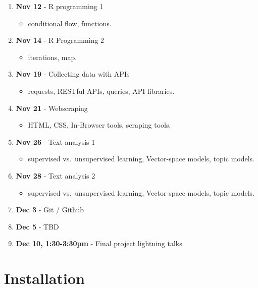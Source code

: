 \documentclass[]{book}
\providecommand{\tightlist}{%
  \setlength{\itemsep}{0pt}\setlength{\parskip}{0pt}}
\begin{document}
\begin{enumerate}
\def\labelenumi{\arabic{enumi}.}
\setcounter{enumi}{12}
\item
  \textbf{Nov 12} - R programming 1

  \begin{itemize}
  \tightlist
  \item
    conditional flow, functions.
  \end{itemize}
\item
  \textbf{Nov 14} - R Programming 2

  \begin{itemize}
  \tightlist
  \item
    iterations, map.
  \end{itemize}
\item
  \textbf{Nov 19} - Collecting data with APIs

  \begin{itemize}
  \tightlist
  \item
    requests, RESTful APIs, queries, API libraries.
  \end{itemize}
\item
  \textbf{Nov 21} - Webscraping

  \begin{itemize}
  \tightlist
  \item
    HTML, CSS, In-Browser tools, scraping tools.
  \end{itemize}
\item
  \textbf{Nov 26} - Text analysis 1

  \begin{itemize}
  \tightlist
  \item
    supervised vs.~unsupervised learning, Vector-space models, topic
    models.
  \end{itemize}
\item
  \textbf{Nov 28} - Text analysis 2

  \begin{itemize}
  \tightlist
  \item
    supervised vs.~unsupervised learning, Vector-space models, topic
    models.
  \end{itemize}
\item
  \textbf{Dec 3} - Git / Github
\item
  \textbf{Dec 5} - TBD
\item
  \textbf{Dec 10, 1:30-3:30pm} - Final project lightning talks
\end{enumerate}

\chapter{Installation}\label{installation}
\end{document}
